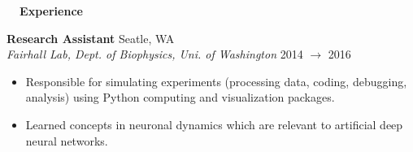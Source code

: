 \documentclass[a4paper,12pt]{article}
\newcommand{\resheading}[1]{{\vspace*{.06in} \colorbox{mygrey}{\begin{minipage}{\textwidth}{\textmd{\large \textbf{#1} \vphantom{p\^{E}}}}\end{minipage}}} }
\newcommand{\ressubheading}[4]{
        \textbf{#1} \hfill #2\\
        \textit{#3} \hfill #4 \\}
\begin{document}
%
%    
%    
%    
\resheading{~~Experience}


\ressubheading{Research Assistant}{Seatle, WA}{Fairhall Lab, Dept. of Biophysics, Uni. of Washington}{2014 $\rightarrow$ 2016}
\begin{itemize}[noitemsep,topsep=0pt,parsep=0pt,partopsep=0pt, nolistsep] \vspace{-10pt}
\item Responsible for simulating experiments (processing data, coding, debugging, analysis) using Python computing and visualization packages.
\item Learned concepts in neuronal dynamics which are relevant to artificial deep neural networks.\\
\end{itemize}
 
\end{document}
